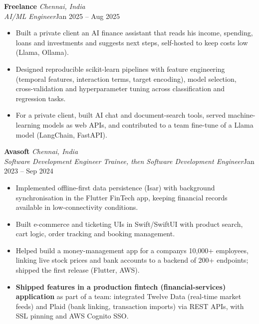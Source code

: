\documentclass[a4paper,11pt]{article}
\newcommand{\role}[4]{%
  \textbf{#1}{\color{muted}\,\textperiodcentered\,\textit{#2}}\\
  \textit{#4}\hfill{\color{muted}#3}\par}
\newcommand{\gap}{\vspace{5pt}}
\newcommand{\num}[1]{\textbf{#1}}   %
\begin{document}
\gap
{}
\role{Freelance}{Chennai, India}{Jan 2025 – Aug 2025}{AI/ML Engineer}
\begin{itemize}
  \item Built a private client an AI finance assistant that reads his income, spending, loans and investments and suggests next steps, self-hosted to keep costs low (Llama, Ollama).
  \item Designed reproducible scikit-learn pipelines with feature engineering (temporal features, interaction terms, target encoding), model selection, cross-validation and hyperparameter tuning across classification and regression tasks.
  \item For a private client, built AI chat and document-search tools, served machine-learning models as web APIs, and contributed to a team fine-tune of a Llama model (LangChain, FastAPI).
\end{itemize}
\gap
{}
\role{Avasoft}{Chennai, India}{Jan 2023 – Sep 2024}{Software Development Engineer Trainee, then Software Development Engineer}
\begin{itemize}
  \item Implemented offline-first data persistence (Isar) with background synchronisation in the Flutter FinTech app, keeping financial records available in low-connectivity conditions.
  \item Built e-commerce and ticketing UIs in Swift/SwiftUI with product search, cart logic, order tracking and booking management.
  \item Helped build a money-management app for a company\textquotesingle{}s 10,000+ employees, linking live stock prices and bank accounts to a backend of 200+ endpoints; shipped the first release (Flutter, AWS).
  \item \num{Shipped features in a production fintech (financial-services) application} as part of a team: integrated Twelve Data (real-time market feeds) and Plaid (bank linking, transaction imports) via REST APIs, with SSL pinning and AWS Cognito SSO.
\end{itemize}
\end{document}
